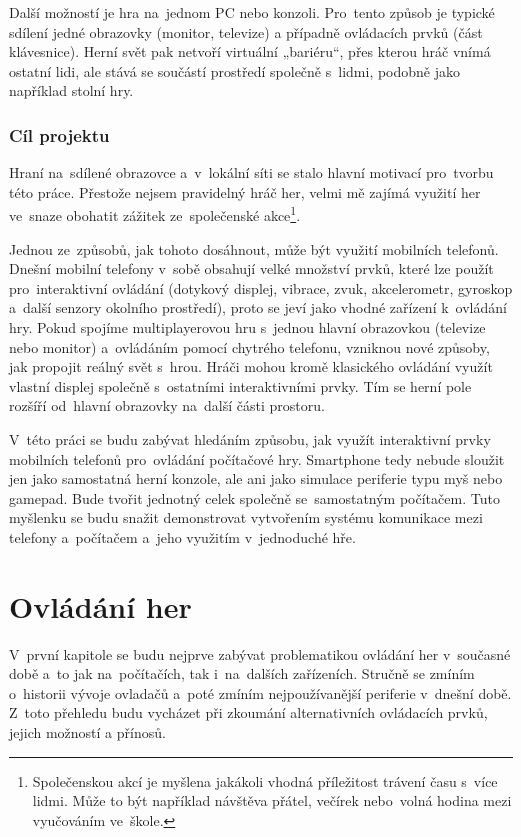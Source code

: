 \documentclass[thesis=B,czech,hidelinks]{FITthesis}[2012/06/26] %
\begin{document}
\begin{introduction}
Další možností je hra na~jednom PC nebo konzoli. Pro~tento způsob je typické sdílení jedné obrazovky (monitor, televize) a případně ovládacích prvků (část klávesnice). Herní svět pak netvoří virtuální „bariéru“, přes kterou hráč vnímá ostatní lidi, ale stává se součástí prostředí společně s~lidmi, podobně jako například stolní hry.

\subsection{Cíl projektu}

Hraní na~sdílené obrazovce a~v~lokální síti se stalo hlavní motivací pro~tvorbu této práce. Přestože nejsem pravidelný hráč her, velmi mě zajímá využití her ve~snaze obohatit zážitek ze~společenské akce\footnote{Společenskou akcí je myšlena jakákoli vhodná příležitost trávení času s~více lidmi. Může to být například návštěva přátel, večírek nebo~volná hodina mezi vyučováním ve~škole.}. 

Jednou ze~způsobů, jak tohoto dosáhnout, může být využití mobilních telefonů. Dnešní mobilní telefony v~sobě obsahují velké množství prvků, které lze použít pro~interaktivní ovládání (dotykový displej, vibrace, zvuk, akcelerometr, gyroskop a~další senzory okolního prostředí), proto se jeví jako vhodné zařízení k~ovládání hry. Pokud spojíme multiplayerovou hru s~jednou hlavní obrazovkou (televize nebo monitor) a~ovládáním pomocí chytrého telefonu, vzniknou nové způsoby, jak propojit reálný svět s~hrou. Hráči mohou kromě klasického ovládání využít vlastní displej společně s~ostatními interaktivními prvky. Tím se herní pole rozšíří od~hlavní obrazovky na~další části prostoru.

V~této práci se budu zabývat hledáním způsobu, jak využít interaktivní prvky mobilních telefonů pro~ovládání počítačové hry. Smartphone tedy nebude sloužit jen jako samostatná herní konzole, ale ani jako simulace periferie typu myš nebo gamepad. Bude tvořit jednotný celek společně se~samostatným počítačem. Tuto myšlenku se budu snažit demonstrovat vytvořením systému komunikace mezi telefony a~počítačem a~jeho využitím v~jednoduché hře.

\end{introduction}

\chapter{Ovládání her}

V~první kapitole se budu nejprve zabývat problematikou ovládání her v~současné době a~to jak na~počítačích, tak i~na~dalších zařízeních. Stručně se zmíním o~historii vývoje ovladačů a~poté zmíním nejpoužívanější periferie v~dnešní době. Z~toto přehledu budu vycházet při zkoumání alternativních ovládacích prvků, jejich možností a přínosů.
 
\end{document}

